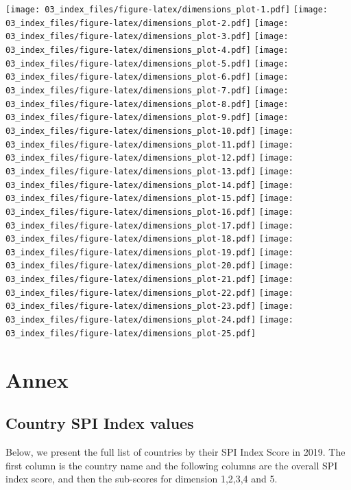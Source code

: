 \documentclass[
]{article}
\begin{document}
\texttt{[image: 03\_index\_files/figure-latex/dimensions\_plot-1.pdf]} \texttt{[image: 03\_index\_files/figure-latex/dimensions\_plot-2.pdf]} \texttt{[image: 03\_index\_files/figure-latex/dimensions\_plot-3.pdf]} \texttt{[image: 03\_index\_files/figure-latex/dimensions\_plot-4.pdf]} \texttt{[image: 03\_index\_files/figure-latex/dimensions\_plot-5.pdf]} \texttt{[image: 03\_index\_files/figure-latex/dimensions\_plot-6.pdf]} \texttt{[image: 03\_index\_files/figure-latex/dimensions\_plot-7.pdf]} \texttt{[image: 03\_index\_files/figure-latex/dimensions\_plot-8.pdf]} \texttt{[image: 03\_index\_files/figure-latex/dimensions\_plot-9.pdf]} \texttt{[image: 03\_index\_files/figure-latex/dimensions\_plot-10.pdf]} \texttt{[image: 03\_index\_files/figure-latex/dimensions\_plot-11.pdf]} \texttt{[image: 03\_index\_files/figure-latex/dimensions\_plot-12.pdf]} \texttt{[image: 03\_index\_files/figure-latex/dimensions\_plot-13.pdf]} \texttt{[image: 03\_index\_files/figure-latex/dimensions\_plot-14.pdf]} \texttt{[image: 03\_index\_files/figure-latex/dimensions\_plot-15.pdf]} \texttt{[image: 03\_index\_files/figure-latex/dimensions\_plot-16.pdf]} \texttt{[image: 03\_index\_files/figure-latex/dimensions\_plot-17.pdf]} \texttt{[image: 03\_index\_files/figure-latex/dimensions\_plot-18.pdf]} \texttt{[image: 03\_index\_files/figure-latex/dimensions\_plot-19.pdf]} \texttt{[image: 03\_index\_files/figure-latex/dimensions\_plot-20.pdf]} \texttt{[image: 03\_index\_files/figure-latex/dimensions\_plot-21.pdf]} \texttt{[image: 03\_index\_files/figure-latex/dimensions\_plot-22.pdf]} \texttt{[image: 03\_index\_files/figure-latex/dimensions\_plot-23.pdf]} \texttt{[image: 03\_index\_files/figure-latex/dimensions\_plot-24.pdf]} \texttt{[image: 03\_index\_files/figure-latex/dimensions\_plot-25.pdf]}

\hypertarget{annex}{%
\section{Annex}\label{annex}}

\hypertarget{country-spi-index-values}{%
\subsection{Country SPI Index values}\label{country-spi-index-values}}

Below, we present the full list of countries by their SPI Index Score in 2019. The first column is the country name and the following columns are the overall SPI index score, and then the sub-scores for dimension 1,2,3,4 and 5.
\end{document}
